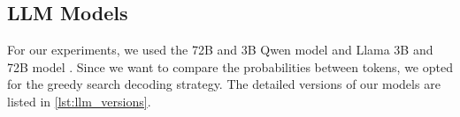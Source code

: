 \documentclass[11pt]{article}
\begin{document}



\subsection{LLM Models}


For our experiments, we used the 72B and 3B Qwen model \citep{qwen2025qwen25technicalreport} and Llama 3B and 72B model \citep{grattafiori2024llama3herdmodels}. Since we want to compare the probabilities between tokens, we opted for the greedy search decoding strategy. The detailed versions of our models are listed in \autoref{lst:llm_versions}.
\end{document}
